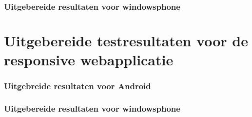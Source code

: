 \documentclass[pdftex,a4paper,12pt,twoside]{report}
\begin{document}
\subsection{Uitgebereide resultaten voor windowsphone}
\chapter{Uitgebereide testresultaten voor de responsive webapplicatie}
\subsection{Uitgebreide resultaten voor Android}
\subsection{Uitgebereide resultaten voor windowsphone}
\end{document}
